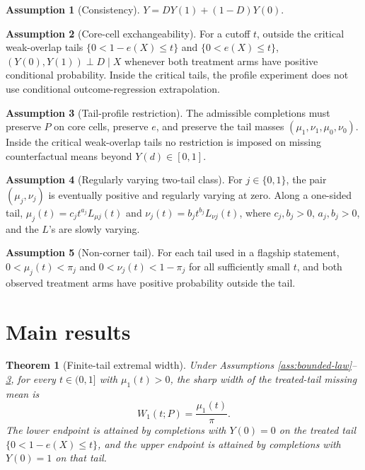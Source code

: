 \documentclass[11pt]{article}
\theoremstyle{definition}
\newtheorem{assumption}{Assumption}
\theoremstyle{plain}
\newtheorem{theorem}{Theorem}
\theoremstyle{remark}
\begin{document}
\begin{assumption}[Consistency]\label{ass:consistency}
\(Y=DY(1)+(1-D)Y(0)\).
\end{assumption}

\begin{assumption}[Core-cell exchangeability]\label{ass:exchange}
For a cutoff \(t\), outside the critical weak-overlap tails \(\{0<1-e(X)\le t\}\) and \(\{0<e(X)\le t\}\), \((Y(0),Y(1))\perp D\mid X\) whenever both treatment arms have positive conditional probability.  Inside the critical tails, the profile experiment does not use conditional outcome-regression extrapolation.
\end{assumption}

\begin{assumption}[Tail-profile restriction]\label{ass:tail-profile}
The admissible completions must preserve \(P\) on core cells, preserve \(e\), and preserve the tail masses \((\mu_1,\nu_1,\mu_0,\nu_0)\).  Inside the critical weak-overlap tails no restriction is imposed on missing counterfactual means beyond \(Y(d)\in[0,1]\).
\end{assumption}

\begin{assumption}[Regularly varying two-tail class]\label{ass:regular-tail}
For \(j\in\{0,1\}\), the pair \((\mu_j,\nu_j)\) is eventually positive and regularly varying at zero.  Along a one-sided tail, \(\mu_j(t)=c_j t^{a_j}L_{\mu j}(t)\) and \(\nu_j(t)=b_j t^{b_j}L_{\nu j}(t)\), where \(c_j,b_j>0\), \(a_j,b_j>0\), and the \(L\)'s are slowly varying.
\end{assumption}

\begin{assumption}[Non-corner tail]\label{ass:noncorner}
For each tail used in a flagship statement, \(0<\mu_j(t)<\pi_j\) and \(0<\nu_j(t)<1-\pi_j\) for all sufficiently small \(t\), and both observed treatment arms have positive probability outside the tail.
\end{assumption}

\section{Main results}
\begin{theorem}[Finite-tail extremal width]\label{thm:finite-tail}
Under Assumptions \ref{ass:bounded-law}--\ref{ass:tail-profile}, for every \(t\in(0,1]\) with \(\mu_1(t)>0\), the sharp width of the treated-tail missing mean is
\[
W_1(t;P)=\frac{\mu_1(t)}{\pi}.
\]
The lower endpoint is attained by completions with \(Y(0)=0\) on the treated tail \(\{0<1-e(X)\le t\}\), and the upper endpoint is attained by completions with \(Y(0)=1\) on that tail.
\end{theorem}
\end{document}
